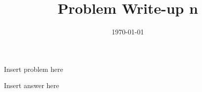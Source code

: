 \documentclass[12pt,a4paper]{article}
\title{Problem Write-up n}
\date{\today}
\begin{document}
    \begin{problem}
        Insert problem here
    \end{problem}
    
    \begin{answer}
        Insert answer here
    \end{answer}
\end{document}
